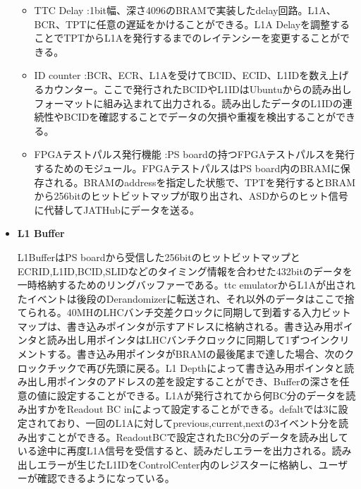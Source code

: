 \begin{itemize}
\begin{itemize}
        \item{TTC Delay :}1bit幅、深さ4096のBRAMで実装したdelay回路。L1A、BCR、TPTに任意の遅延をかけることができる。L1A Delayを調整することでTPTからL1Aを発行するまでのレイテンシーを変更することができる。
        \baselineskip

        \item{ID counter :}BCR、ECR、L1Aを受けてBCID、ECID、L1IDを数え上げるカウンター。ここで発行されたBCIDやL1IDはUbuntuからの読み出しフォーマットに組み込まれて出力される。読み出したデータのL1IDの連続性やBCIDを確認することでデータの欠損や重複を検出することができる。
        \baselineskip
        
        \item{FPGAテストパルス発行機能 :}PS boardの持つFPGAテストパルスを発行するためのモジュール。FPGAテストパルスはPS board内のBRAMに保存される。BRAMのaddressを指定した状態で、TPTを発行するとBRAMから256bitのヒットビットマップが取り出され、ASDからのヒット信号に代替してJATHubにデータを送る。
        \baselineskip
    \end{itemize}

    \item \textbf{L1 Buffer} \par
    L1BufferはPS boardから受信した256bitのヒットビットマップとECRID,L1ID,BCID,SLIDなどのタイミング情報を合わせた432bitのデータを一時格納するためのリングバッファーである。ttc emulatorからL1Aが出されたイベントは後段のDerandomizerに転送され、それ以外のデータはここで捨てられる。40MHのLHCバンチ交差クロックに同期して到着する入力ビットマップは、書き込みポインタが示すアドレスに格納される。書き込み用ポインタと読み出し用ポインタはLHCバンチクロックに同期して1ずつインクリメントする。書き込み用ポインタがBRAMの最後尾まで達した場合、次のクロックチックで再び先頭に戻る。L1 Depthによって書き込み用ポインタと読み出し用ポインタのアドレスの差を設定することができ、Bufferの深さを任意の値に設定することができる。L1Aが発行されてから何BC分のデータを読み出すかをReadout BC inによって設定することができる。defaltでは3に設定されており、一回のL1Aに対してprevious,current,nextの3イベント分を読み出すことができる。ReadoutBCで設定されたBC分のデータを読み出している途中に再度L1A信号を受信すると、読みだしエラーを出力される。読み出しエラーが生じたL1IDをControlCenter内のレジスターに格納し、ユーザーが確認できるようになっている。
    \baselineskip


\end{itemize}

